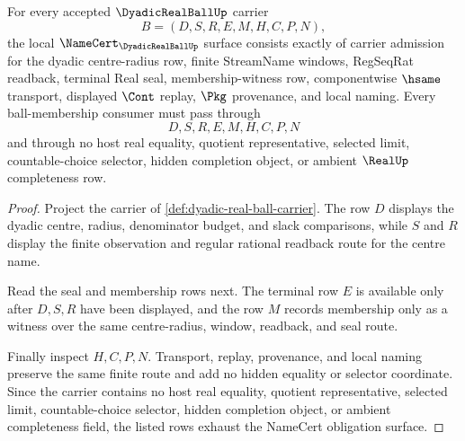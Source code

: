 \begin{theorem}
\label{thm:dyadic-real-ball-namecert-obligations}
For every accepted $\DyadicRealBallUp$ carrier
$$
B=(D,S,R,E,M,H,C,P,N),
$$
the local $\NameCert_{\DyadicRealBallUp}$ surface consists exactly of carrier admission for the dyadic centre-radius row, finite StreamName windows, RegSeqRat readback, terminal Real seal, membership-witness row, componentwise $\hsame$ transport, displayed $\Cont$ replay, $\Pkg$ provenance, and local naming. Every ball-membership consumer must pass through
$$
D,S,R,E,M,H,C,P,N
$$
and through no host real equality, quotient representative, selected limit, countable-choice selector, hidden completion object, or ambient $\RealUp$ completeness row.
\end{theorem}
\begin{proof}
Project the carrier of \autoref{def:dyadic-real-ball-carrier}. The row $D$ displays the dyadic centre, radius, denominator budget, and slack comparisons, while $S$ and $R$ display the finite observation and regular rational readback route for the centre name.

Read the seal and membership rows next. The terminal row $E$ is available only after $D,S,R$ have been displayed, and the row $M$ records membership only as a witness over the same centre-radius, window, readback, and seal route.

Finally inspect $H,C,P,N$. Transport, replay, provenance, and local naming preserve the same finite route and add no hidden equality or selector coordinate. Since the carrier contains no host real equality, quotient representative, selected limit, countable-choice selector, hidden completion object, or ambient completeness field, the listed rows exhaust the NameCert obligation surface.
\end{proof}


\begin{closurestatus}{\DyadicRealBallUp}
  \theoryclosure{\seedClosure}
  \formalstatus{\unformalizedV}
\end{closurestatus}

